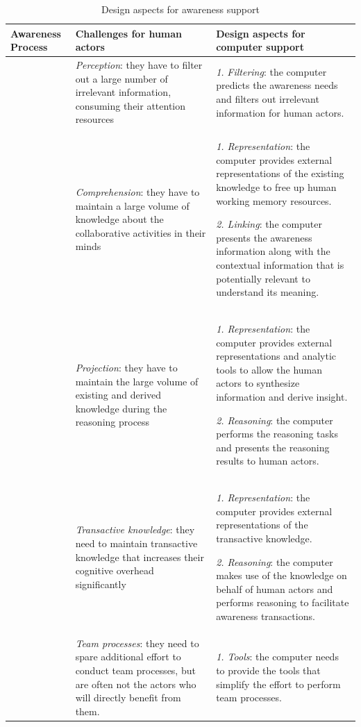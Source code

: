 \begin{table}[htbp]
\centering
\footnotesize
\begin{tabular}{>{\raggedright}p{1.2in}>{\raggedright}p{2.2in}>{\raggedright}p{2.2in}}
\toprule 
\textbf{Awareness Process} & \textbf{Challenges for human actors} & \textbf{Design aspects for computer support}\tabularnewline
\midrule 
\multirow{3}{1.2in}{Development of individual awareness} & \emph{Perception}: they have to filter out a large number of irrelevant
information, consuming their attention resources & \emph{1.} \emph{Filtering}: the computer predicts the awareness needs
and filters out irrelevant information for human actors.\tabularnewline
\cmidrule{2-3} 
 & \emph{Comprehension}: they have to maintain a large volume of knowledge
about the collaborative activities in their minds & \emph{1. Representation}: the computer provides external representations
of the existing knowledge to free up human working memory resources.

\emph{2. Linking}: the computer presents the awareness information
along with the contextual information that is potentially relevant
to understand its meaning.\tabularnewline
\cmidrule{2-3} 
 & \emph{Projection}: they have to maintain the large volume of existing
and derived knowledge during the reasoning process  & \emph{1. Representation}: the computer provides external representations
and analytic tools to allow the human actors to synthesize information
and derive insight.

\emph{2. Reasoning}: the computer performs the reasoning tasks and
presents the reasoning results to human actors.\tabularnewline
\midrule 
\multirow{3}{1.2in}{Development of collaborative awareness} & \emph{Transactive knowledge}: they need to maintain transactive knowledge
that increases their cognitive overhead significantly & \emph{1. Representation}: the computer provides external representations
of the transactive knowledge.

\emph{2. Reasoning}: the computer makes use of the knowledge on behalf
of human actors and performs reasoning to facilitate awareness transactions.\tabularnewline
\cmidrule{2-3} 
 & \emph{Team processes}: they need to spare additional effort to conduct
team processes, but are often not the actors who will directly benefit
from them. & \emph{1. Tools}: the computer needs to provide the tools that simplify
the effort to perform team processes.\tabularnewline
\bottomrule
\end{tabular}  
\caption{Design aspects for awareness support}
\label{tab:design_aspects}
\end{table}


